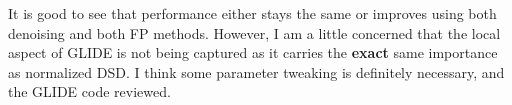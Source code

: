 \documentclass[11pt]{article}
\begin{document}
It is good to see that performance either stays the same or improves
using both denoising and both FP methods. However, I am a little
concerned that the local aspect of GLIDE is not being captured as it
carries the \textbf{exact} same importance as normalized DSD. I think some
parameter tweaking is definitely necessary, and the GLIDE code
reviewed.
\end{document}
